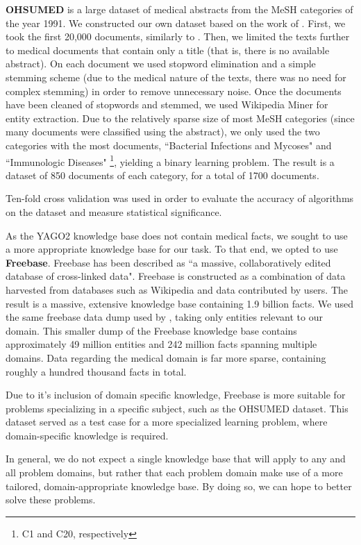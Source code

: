\documentclass[twoside,11pt]{article}
\theoremstyle{definition}
\begin{document}
\textbf{OHSUMED} is a large dataset of medical abstracts from the MeSH categories of the year 1991. 
We constructed our own dataset based on the work of .
First, we took the first 20,000 documents, similarly to .
Then, we limited the texts further to medical documents that contain only a title (that is, there is no available abstract). On each document we used stopword elimination and a simple stemming scheme (due to the medical nature of the texts, there was no need for complex stemming) in order to remove unnecessary noise. Once the documents have been cleaned of stopwords and stemmed, we used Wikipedia Miner \cite{milne2013open} for entity extraction. 
Due to the relatively sparse size of most MeSH categories (since many documents were classified using the abstract), we only used the two categories with the most documents, ``Bacterial Infections and Mycoses" and ``Immunologic Diseases" \footnote{C1 and C20, respectively}, yielding a binary learning problem.
The result is a dataset of 850 documents of each category, for a total of 1700 documents.

Ten-fold cross validation was used in order to evaluate the accuracy of algorithms on the dataset and measure statistical significance.

As the YAGO2 knowledge base does not contain medical facts, we sought to use a more appropriate knowledge base for our task. To that end, we opted to use \textbf{Freebase}.
Freebase has been described as ``a massive, collaboratively edited database of cross-linked data". Freebase is constructed as a combination of data harvested from databases such as Wikipedia and data contributed by users. The result is a massive, extensive knowledge base containing 1.9 billion facts. 
We used the same freebase data dump used by , taking only entities relevant to our domain. This smaller dump of the Freebase knowledge base contains approximately 49 million entities and 242 million facts spanning multiple domains. Data regarding the medical domain is far more sparse, containing roughly a hundred thousand facts in total.

Due to it's inclusion of domain specific knowledge, Freebase is more suitable for problems specializing in a specific subject, such as the OHSUMED dataset. 
This dataset served as a test case for a more specialized learning problem, where domain-specific knowledge is required.

In general, we do not expect a single knowledge base that will apply to any and all problem domains, but rather that each problem domain make use of a more tailored, domain-appropriate knowledge base. By doing so, we can hope to better solve these problems.
\end{document}
